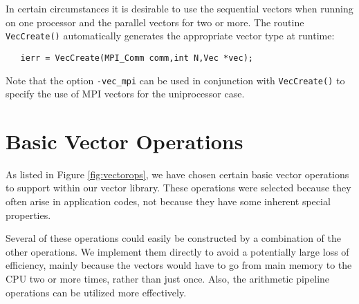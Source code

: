 In certain circumstances it is desirable to use the sequential vectors
when running on one processor and the parallel vectors for two or
more.  The routine {\tt VecCreate()} 
automatically generates the appropriate vector type at runtime:
\begin{verbatim}
   ierr = VecCreate(MPI_Comm comm,int N,Vec *vec);
\end{verbatim}
Note that the option {\tt -vec\_mpi} can be used in conjunction with
{\tt VecCreate()} to specify the use of MPI vectors for the
uniprocessor case.

\section{Basic Vector Operations}
As listed in Figure \ref{fig:vectorops}, we have chosen certain 
basic vector operations to support within our vector library.
These operations were selected because they often arise in application 
codes, not because they have some inherent special properties. 

\begin{design}
Several of these operations could easily be constructed
by a combination of the other operations. 
We implement them directly to avoid a potentially large loss of efficiency, 
mainly because the vectors would have to go from main memory to the 
CPU two or more times, rather than just once.  Also, the arithmetic 
pipeline operations can be utilized more effectively.
\end{design}

